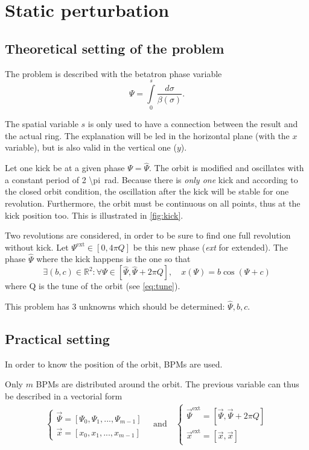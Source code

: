\section{Static perturbation}
\label{sec:loc_static}

\subsection{Theoretical setting of the problem}
The problem is described with the betatron phase variable
\begin{equation}
\Psi = \int\limits_{0}^s \frac{d\sigma}{\beta(\sigma)}.
\end{equation}

The spatial variable $s$ is only used to have a connection between the result and the actual ring. The explanation will be led in the horizontal plane (with the $x$ variable), but is also valid in the vertical one ($y$).

Let one kick be at a given phase $\Psi = \hat{\Psi}$. The orbit is modified and oscillates with a constant period of \SI{2 \pi}{\radian}. Because there is \emph{only one} kick and according to the closed orbit condition, the oscillation after the kick will be stable for one revolution. Furthermore, the orbit must be continuous on all points, thus at the kick position too. This is illustrated in \cref{fig:kick}.

Two revolutions are considered, in order to be sure to find one full revolution without kick. Let $\Psi^\mathrm{ext} \in [0, 4 \pi Q]$ be this new phase (\textit{ext} for extended). The phase $\hat\Psi$ where the kick happens is the one so that
\begin{equation}
\exists (b, c) \in \mathbb{R}^2:
\forall \Psi \in [\hat\Psi, \hat\Psi + 2 \pi Q], \quad
x(\Psi) = b \cos(\Psi + c)
\end{equation}
where Q is the tune of the orbit (see \cref{eq:tune}).

This problem has 3 unknowns which should be determined: $\hat\Psi, b, c$.

\subsection{Practical setting}
In order to know the position of the orbit, BPMs are used.

Only $m$ BPMs are distributed around the orbit. The previous variable can thus be described in a vectorial form
\begin{align}
\begin{cases}
\vec{\Psi} = [\Psi_0, \Psi_1, ..., \Psi_{m-1}] \\
\vec{x} = [x_0, x_1, ..., x_{m-1}]
\end{cases} \quad \mathrm{and} \quad
\begin{cases}
\vec{\Psi}^\mathrm{ext} = [\vec{\Psi}, \vec{\Psi}+2\pi Q ]\\
\vec{x}^\mathrm{ext} = [\vec{x}, \vec{x}]
\end{cases}
\end{align}

